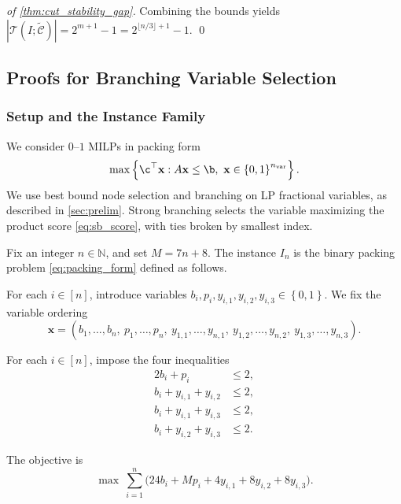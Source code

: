 \documentclass[smallextended,envcountsect]{svjour3} %
\let\ACCb\b
\let\ACCc\c
\newcommand{\N}{\mathbb{N}}
\newcommand{\set}[1]{\left\{#1\right\}}
\newcommand{\x}{\mathbf{x}}
\renewcommand{\b}{\mathbf{b}}
\renewcommand{\c}{\mathbf{c}}
\newcommand{\Tcal}{\mathcal{T}}
\newcommand{\Ccal}{\mathcal{C}}
\newcommand{\0}{\mathbf{0}}
\newcommand{\1}{\mathbf{1}} %
\let\b\ACCb
\let\c\ACCc
\begin{document}
\begin{proof}[of \cref{thm:cut_stability_gap}]
	Combining the bounds yields $|\Tcal(I;\widetilde{\Ccal})|=2^{m+1}-1=2^{\lfloor n/3\rfloor+1}-1$.
\qed
\end{proof}









\subsection{Proofs for Branching Variable Selection}
\label{app:branching_proofs}

\subsubsection{Setup and the Instance Family}


We consider $0$--$1$ MILPs in packing form
\begin{equation}\label{eq:packing_form}
	\max\set{\c^\top \x : A\x\le\b,\ \x\in\set{0,1}^{n_{\mathrm{var}}}}.
\end{equation}
We use best bound node selection and branching on LP fractional variables, as described in \cref{sec:prelim}.
Strong branching selects the variable maximizing the product score \eqref{eq:sb_score}, with ties broken by smallest index.

\begin{definition}\label{def:InK}
	Fix an integer $n\in\N$, and set $M=7n+8$.
	The instance $I_n$ is the binary packing problem \eqref{eq:packing_form} defined as follows.

	For each $i\in[n]$, introduce variables $b_i,p_i,y_{i,1},y_{i,2},y_{i,3}\in\set{0,1}$.
	We fix the variable ordering
	\[
		\x=(b_1,\dots,b_n,\ p_1,\dots,p_n,\ y_{1,1},\dots,y_{n,1},\ y_{1,2},\dots,y_{n,2},\ y_{1,3},\dots,y_{n,3}).
	\]

	For each $i\in[n]$, impose the four inequalities
	\begin{align}
		2b_i+p_i            & \le 2,\label{eq:block_C1}  \\
		b_i+y_{i,1}+y_{i,2} & \le 2,\label{eq:block_C2a} \\
		b_i+y_{i,1}+y_{i,3} & \le 2,\label{eq:block_C2b} \\
		b_i+y_{i,2}+y_{i,3} & \le 2.\label{eq:block_C2c}
	\end{align}

	The objective is
	\begin{equation}\label{eq:InK_obj}
		\max\ \sum_{i=1}^n\bigl(24b_i+Mp_i+4y_{i,1}+8y_{i,2}+8y_{i,3}\bigr).
	\end{equation}
\end{definition}
\end{document}
